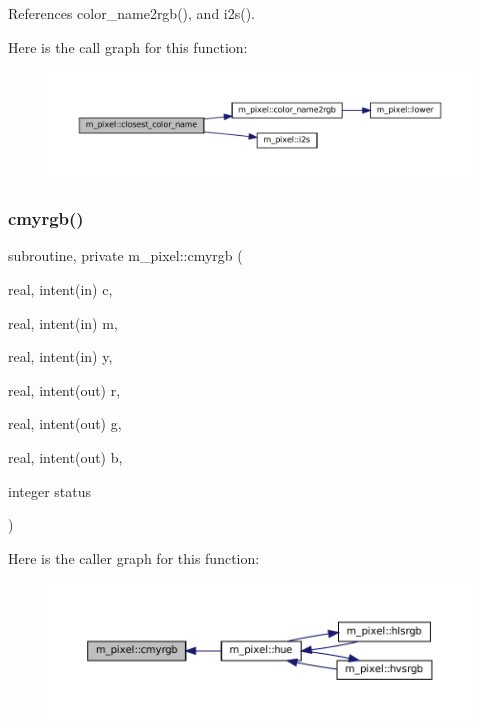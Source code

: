 References color\+\_\+name2rgb(), and i2s().

Here is the call graph for this function\+:
\nopagebreak
\begin{figure}[H]
\begin{center}
\leavevmode
\includegraphics[width=350pt]{namespacem__pixel_a8555eecec7e18106e8167e137cfe8424_cgraph}
\end{center}
\end{figure}
\mbox{\label{namespacem__pixel_a98c49513d301803bb2c5cd28b8ccdba3}} 
\subsubsection{\texorpdfstring{cmyrgb()}{cmyrgb()}}
{\footnotesize\ttfamily subroutine, private m\+\_\+pixel\+::cmyrgb (\begin{DoxyParamCaption}\item[{real, intent(in)}]{c,  }\item[{real, intent(in)}]{m,  }\item[{real, intent(in)}]{y,  }\item[{real, intent(out)}]{r,  }\item[{real, intent(out)}]{g,  }\item[{real, intent(out)}]{b,  }\item[{integer}]{status }\end{DoxyParamCaption})\hspace{0.3cm}{\ttfamily [private]}}

Here is the caller graph for this function\+:
\nopagebreak
\begin{figure}[H]
\begin{center}
\leavevmode
\includegraphics[width=350pt]{namespacem__pixel_a98c49513d301803bb2c5cd28b8ccdba3_icgraph}
\end{center}
\end{figure}
\mbox{\label{namespacem__pixel_a334bde41bc7b2db19b950b1271ba7463}} 
